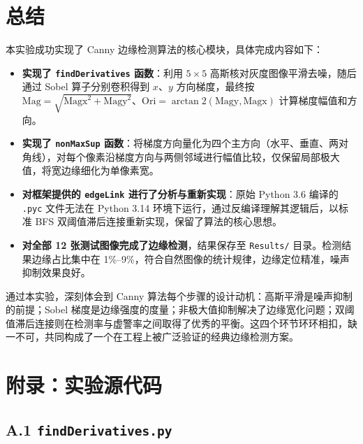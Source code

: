 \documentclass[12pt,a4paper]{ctexart}
\begin{document}
\section{总结}

本实验成功实现了 Canny 边缘检测算法的核心模块，具体完成内容如下：

\begin{itemize}
  \item \textbf{实现了 \texttt{findDerivatives} 函数}：利用 $5\times5$ 高斯核对灰度图像平滑去噪，随后通过 Sobel 算子分别卷积得到 $x$、$y$ 方向梯度，最终按 $\text{Mag}=\sqrt{\text{Magx}^2+\text{Magy}^2}$、$\text{Ori}=\arctan2(\text{Magy}, \text{Magx})$ 计算梯度幅值和方向。
  \item \textbf{实现了 \texttt{nonMaxSup} 函数}：将梯度方向量化为四个主方向（水平、垂直、两对角线），对每个像素沿梯度方向与两侧邻域进行幅值比较，仅保留局部极大值，将宽边缘细化为单像素宽。
  \item \textbf{对框架提供的 \texttt{edgeLink} 进行了分析与重新实现}：原始 Python 3.6 编译的 \texttt{.pyc} 文件无法在 Python 3.14 环境下运行，通过反编译理解其逻辑后，以标准 BFS 双阈值滞后连接重新实现，保留了算法的核心思想。
  \item \textbf{对全部 12 张测试图像完成了边缘检测}，结果保存至 \texttt{Results/} 目录。检测结果边缘占比集中在 1\%--9\%，符合自然图像的统计规律，边缘定位精准，噪声抑制效果良好。
\end{itemize}

通过本实验，深刻体会到 Canny 算法每个步骤的设计动机：高斯平滑是噪声抑制的前提；Sobel 梯度是边缘强度的度量；非极大值抑制解决了边缘宽化问题；双阈值滞后连接则在检测率与虚警率之间取得了优秀的平衡。这四个环节环环相扣，缺一不可，共同构成了一个在工程上被广泛验证的经典边缘检测方案。

\section*{附录：实验源代码}

\subsection*{A.1 \texttt{findDerivatives.py}}
\end{document}

